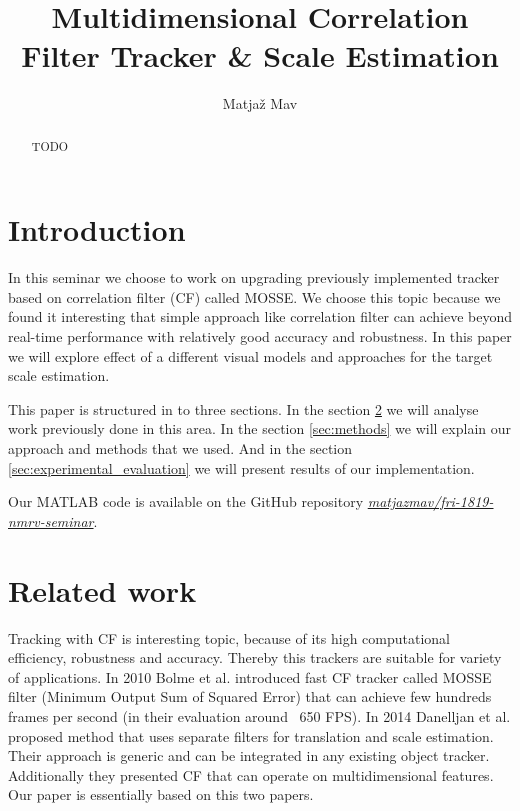 \documentclass[runningheads]{llncs}
\begin{document}
% 
\title{Multidimensional Correlation Filter Tracker \& Scale Estimation}
\author{Matjaž Mav}
%
\maketitle
%
\begin{abstract}
TODO
\end{abstract}

\section{Introduction}
In this seminar we choose to work on upgrading previously implemented tracker based on correlation filter (CF) called MOSSE. We choose this topic because we found it interesting that simple approach like correlation filter can achieve beyond real-time performance with relatively good accuracy and robustness. In this paper we will explore effect of a different visual models and approaches for the target scale estimation.

This paper is structured in to three sections. In the section \ref{sec:related_work} we will analyse work previously done in this area. In the section \ref{sec:methods} we will explain our approach and methods that we used. And in the section \ref{sec:experimental_evaluation} we will present results of our implementation.

Our MATLAB code is available on the GitHub repository \href{https://github.com/matjazmav/fri-1819-nmrv-seminar}{\textit{matjazmav/fri-1819-nmrv-seminar}}.

\section{Related work}
\label{sec:related_work}
Tracking with CF is interesting topic, because of its high computational efficiency, robustness and accuracy. Thereby this trackers are suitable for variety of applications. In 2010 Bolme et al. \cite{bolme2010visual} introduced fast CF tracker called MOSSE filter (Minimum Output Sum of Squared Error) that can achieve few hundreds frames per second (in their evaluation around ~650 FPS).  In 2014 Danelljan et al. \cite{danelljan2014accurate} proposed method that uses separate filters for translation and scale estimation. Their approach is generic and can be integrated in any existing object tracker. Additionally they presented CF that can operate on multidimensional features. Our paper is essentially based on this two papers.
\end{document}
